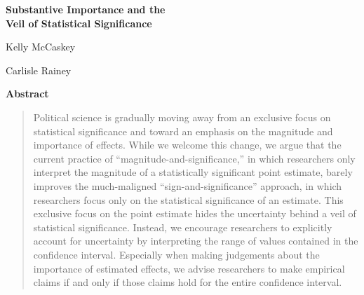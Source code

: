 \documentclass[12pt]{article}
\begin{document}
\begin{center}
{\LARGE \textbf{Substantive Importance and the\\\vspace{2mm}Veil of Statistical Significance}}

\vspace{10mm}

Kelly McCaskey

\vspace{3mm}

Carlisle Rainey
\end{center}

\vspace{10mm}

{\centerline{\textbf{Abstract}}}
\begin{quote}\noindent
Political science is gradually moving away from an exclusive focus on statistical significance and toward an emphasis on the magnitude and importance of effects. While we welcome this change, we argue that the current practice of ``magnitude-and-significance,'' in which researchers only interpret the magnitude of a statistically significant point estimate, barely improves the much-maligned ``sign-and-significance'' approach, in which researchers focus only on the statistical significance of an estimate. This exclusive focus on the point estimate hides the uncertainty behind a veil of statistical significance. Instead, we encourage researchers to explicitly account for uncertainty by interpreting the range of values contained in the confidence interval. Especially when making judgements about the importance of estimated effects, we advise researchers to make empirical claims if and only if those claims hold for the entire confidence interval.
 \end{quote}
\end{document}
